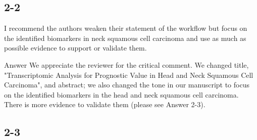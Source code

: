 \documentclass[preprint,12pt]{elsarticle}
\newenvironment{MyColorPar}[1]{%
    \leavevmode\color{#1}\ignorespaces%
}{%
}%
\begin{document}




%
\clearpage
\subsection*{2-2}
I recommend the authors weaken their statement of the workflow but focus on the identified biomarkers in neck squamous cell carcinoma and use as much as possible evidence to support or validate them. %


%
\begin{MyColorPar}{blue}
Answer
We appreciate the reviewer for the critical comment.
We changed title, "Transcriptomic Analysis for Prognostic Value in Head and Neck Squamous Cell Carcinoma", and abstract; we also changed the tone in our manuscript to focus on the identified biomarkers in the head and neck squamous cell carcinoma.
There is more evidence to validate them (please see Answer 2-3).

%
\end{MyColorPar}



\subsection*{2-3}
\end{document}
